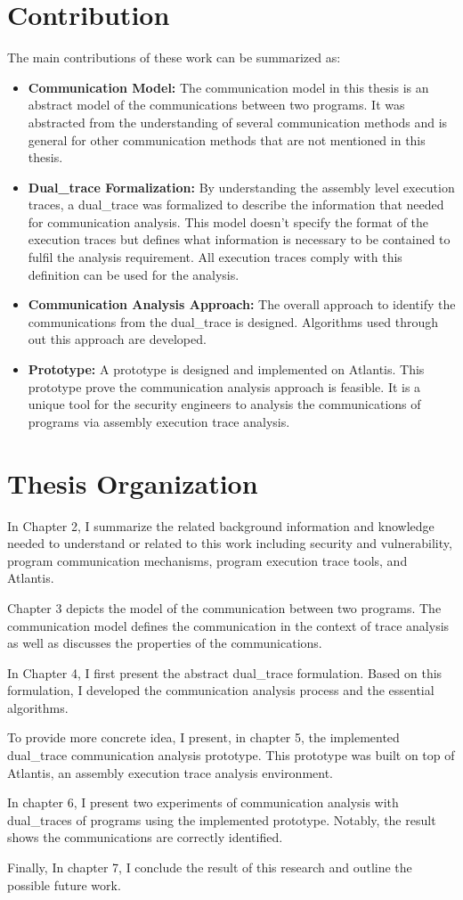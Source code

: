\section{Contribution}
The main contributions of these work can be summarized as:
\begin{itemize}
  \item \textbf{Communication Model:} The communication model in this thesis is an abstract model of the communications between two programs. It was abstracted from the understanding of several communication methods and is general for other communication methods that are not mentioned in this thesis.
  \item \textbf{Dual\_trace Formalization:} By understanding the assembly level execution traces, a dual\_trace was formalized to describe the information that needed for communication analysis. This model doesn't specify the format of the execution traces but defines what information is necessary to be contained to fulfil the analysis requirement. All execution traces comply with this definition can be used for the analysis.
  \item \textbf{Communication Analysis Approach:} The overall approach to identify the communications from the dual\_trace is designed.  Algorithms used through out this approach are developed.
  \item \textbf{Prototype:} A prototype is designed and implemented on Atlantis. This prototype prove the communication analysis approach is feasible. It is a unique tool for the security engineers to analysis the communications of programs via assembly execution trace analysis.
\end{itemize}

\section{Thesis Organization}
In Chapter 2, I summarize the related background information and knowledge needed to understand or related to this work including security and vulnerability, program communication mechanisms, program execution trace tools, and Atlantis. 

Chapter 3 depicts the model of the communication between two programs. The communication model defines the communication in the context of trace analysis as well as discusses the properties of the communications. 

In Chapter 4, I first present the abstract dual\_trace formulation. Based on this formulation, I developed the communication analysis process and the essential algorithms.

To provide more concrete idea, I present, in chapter 5, the implemented dual\_trace communication analysis prototype. This prototype was built on top of Atlantis\cite{huang2017atlantis}, an assembly execution trace analysis environment.

In chapter 6, I present two experiments of communication analysis with dual\_traces of programs using the implemented prototype. Notably, the result shows the communications are correctly identified. 

Finally, In chapter 7, I conclude the result of this research and outline the possible future work.